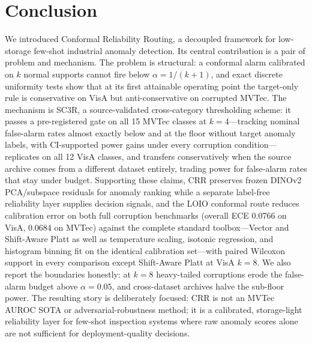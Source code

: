 \section{Conclusion}\label{sec:conclusion}
We introduced Conformal Reliability Routing, a decoupled framework for low-storage few-shot industrial anomaly detection. Its central contribution is a pair of problem and mechanism. The problem is structural: a conformal alarm calibrated on $k$ normal supports cannot fire below $\alpha=1/(k{+}1)$, and exact discrete uniformity tests show that at its first attainable operating point the target-only rule is conservative on VisA but anti-conservative on corrupted MVTec. The mechanism is SC3R, a source-validated cross-category thresholding scheme: it passes a pre-registered gate on all 15 MVTec classes at $k{=}4$---tracking nominal false-alarm rates almost exactly below and at the floor without target anomaly labels, with CI-supported power gains under every corruption condition---replicates on all 12 VisA classes, and transfers conservatively when the source archive comes from a different dataset entirely, trading power for false-alarm rates that stay under budget. Supporting these claims, CRR preserves frozen DINOv2 PCA/subspace residuals for anomaly ranking while a separate label-free reliability layer supplies decision signals, and the LOIO conformal route reduces calibration error on both full corruption benchmarks (overall ECE 0.0766 on VisA, 0.0684 on MVTec) against the complete standard toolbox---Vector and Shift-Aware Platt as well as temperature scaling, isotonic regression, and histogram binning fit on the identical calibration set---with paired Wilcoxon support in every comparison except Shift-Aware Platt at VisA $k{=}8$. We also report the boundaries honestly: at $k{=}8$ heavy-tailed corruptions erode the false-alarm budget above $\alpha{=}0.05$, and cross-dataset archives halve the sub-floor power. The resulting story is deliberately focused: CRR is not an MVTec AUROC SOTA or adversarial-robustness method; it is a calibrated, storage-light reliability layer for few-shot inspection systems where raw anomaly scores alone are not sufficient for deployment-quality decisions.
